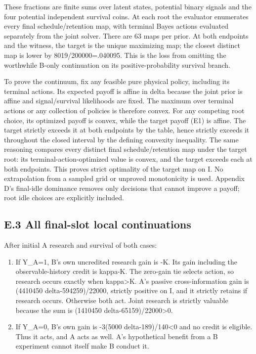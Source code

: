 \documentclass[
  11pt,
]{article}
\providecommand{\tightlist}{%
  \setlength{\itemsep}{0pt}\setlength{\parskip}{0pt}}
\begin{document}
These fractions are finite sums over latent states, potential binary
signals and the four potential independent survival coins. At each root
the evaluator enumerates every final schedule/retention map, with
terminal Bayes actions evaluated separately from the joint solver. There
are 63 maps per prior. At both endpoints and the witness, the target is
the unique maximizing map; the closest distinct map is lower by
8019/200000=.040095. This is the loss from omitting the worthwhile
B-only continuation on its positive-probability survival branch.

To prove the continuum, fix any feasible pure physical policy, including
its terminal actions. Its expected payoff is affine in delta because the
joint prior is affine and signal/survival likelihoods are fixed. The
maximum over terminal actions or any collection of policies is therefore
convex. For any competing root choice, its optimized payoff is convex,
while the target payoff (E1) is affine. The target strictly exceeds it
at both endpoints by the table, hence strictly exceeds it throughout the
closed interval by the defining convexity inequality. The same reasoning
compares every distinct final schedule/retention map under the target
root: its terminal-action-optimized value is convex, and the target
exceeds each at both endpoints. This proves strict optimality of the
target map on I. No extrapolation from a sampled grid or unproved
monotonicity is used. Appendix D's final-idle dominance removes only
decisions that cannot improve a payoff; root idle choices are explicitly
included.

\subsection{E.3 All final-slot local
continuations}\label{e.3-all-final-slot-local-continuations}

After initial A research and survival of both cases:

\begin{enumerate}
\def\labelenumi{\arabic{enumi}.}
\tightlist
\item
  If Y\_A=1, B's own uncredited research gain is -K. Its gain including
  the observable-history credit is kappa-K. The zero-gain tie selects
  action, so research occurs exactly when kappa\textgreater K. A's
  passive cross-information gain is (4410450 delta-594259)/22000,
  strictly positive on I, and it strictly retains if research occurs.
  Otherwise both act. Joint research is strictly valuable because the
  sum is (1410450 delta-65159)/22000\textgreater0.
\item
  If Y\_A=0, B's own gain is -3(5000 delta-189)/140\textless0 and no
  credit is eligible. Thus it acts, and A acts as well. A's hypothetical
  benefit from a B experiment cannot itself make B conduct it.
\end{enumerate}
\end{document}
